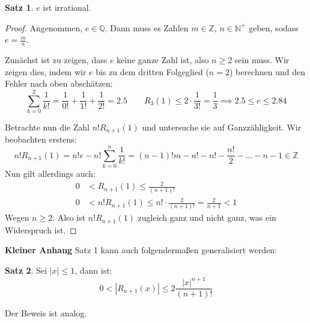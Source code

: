 \documentclass[10pt]{article}
\theoremstyle{definition}
\newtheorem{theorem}{Satz}
\theoremstyle{remark}
\begin{document}
\begin{theorem}
    \(e\) ist irrational.
\end{theorem}
\begin{proof}
    Angenommen, \(e \in \mathbb{Q}\). Dann muss es Zahlen \(m \in \mathbb{Z}\), \(n \in \mathbb{N}^+\) geben, sodass \(e = \frac{m}{n}\).

    Zunächst ist zu zeigen, dass \(e\) keine ganze Zahl ist, also \(n \geq 2\) sein muss. Wir zeigen dies, indem wir \(e\) bis zu dem dritten Folgeglied (\(n=2\)) berechnen und den Fehler nach oben abschätzen:
    \[
        \sum_{k=0}^2 \frac{1}{k!} = \frac{1}{0!} + \frac{1}{1!} + \frac{1}{2!} = 2.5 \qquad R_3(1) \leq 2 \cdot \frac{1}{3!} = \frac{1}{3} \implies 2.5 \leq e \leq 2.84
    \]

    Betrachte nun die Zahl \(n!R_{n+1}(1)\) und untersuche sie auf Ganzzähligkeit. Wir beobachten erstens:
    \[
        n!R_{n+1}(1) = n!e - n!\sum_{k=0}^n \frac{1}{k!} = (n-1)!m - n! - n! - \frac{n!}{2} - ... - n - 1 \in \mathbb{Z}
    \]
    Nun gilt allerdings auch:
    \begin{align*}
        0 &< R_{n+1}(1) \leq \frac{2}{(n+1)!}\\
        0 &< n! R_{n+1}(1) \leq n! \cdot \frac{2}{(n+1)!} = \frac{2}{n+1}  < 1
    \end{align*}
    Wegen \(n \geq 2\). Also ist \(n!R_{n+1}(1)\) zugleich ganz und nicht ganz, was ein Widerspruch ist.
\end{proof}

\textbf{Kleiner Anhang} \quad Satz 1 kann auch folgendermaßen generalisiert werden:
\begin{theorem}
    Sei \(|x| \leq 1\), dann ist:
    \[
        0 < |R_{n+1}(x)| \leq 2 \frac{|x|^{n+1}}{(n+1)!}
    \]
\end{theorem}

Der Beweis ist analog.
\end{document}
